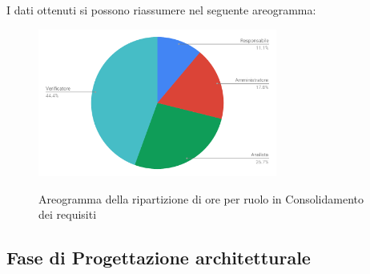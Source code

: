 I dati ottenuti si possono riassumere nel seguente areogramma:
\begin{figure}[H] 
			\centering 
				\includegraphics[width=0.7\textwidth]{res/images/areogramma_consolidamento.pdf}\\
				\caption{Areogramma della ripartizione di ore per ruolo in Consolidamento dei requisiti}
			\label{AreogrammaConsolidaemnto}
\end{figure}

\subsection{Fase di Progettazione architetturale}
